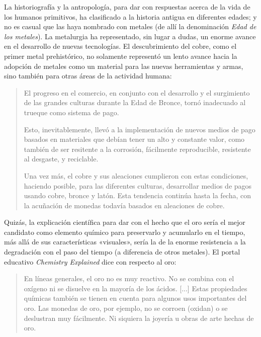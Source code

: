 \documentclass[12pt,a4paper,twoside]{book}
\begin{document}
La historiografía y la antropología, para dar con respuestas acerca de la vida de los humanos primitivos, ha clasificado a la historia antigua en diferentes edades; y no es casual que las haya nombrado con metales (de allí la denominación \textit{Edad de los metales}). La metalurgia ha representado, sin lugar a dudas, un enorme avance en el desarrollo de nuevas tecnologías. El descubrimiento del cobre, como el primer metal prehistórico, no solamente representó un lento avance hacia la adopción de metales como un material para las nuevas herramientas y armas, sino también para otras áreas de la actividad humana:

\begin{quotation}
El progreso en el comercio, en conjunto con el desarrollo y el surgimiento de las grandes culturas durante la Edad de Bronce, tornó inadecuado al trueque como sistema de pago.

Esto, inevitablemente, llevó a la implementación de nuevos medios de pago basados en materiales que debían tener un alto y constante valor, como también de ser resitente a la corrosión, fácilmente reproducible, resistente al desgaste, y reciclable.

Una vez más, el cobre y sus aleaciones cumplieron con estas condiciones, haciendo posible, para las diferentes culturas, desarrollar medios de pagos usando cobre, bronce y latón. Esta tendencia continúa hasta la fecha, con la acuñación de monedas todavía basados en aleaciones de cobre. \cite[pág. 37]{codelco:cobre}
\end{quotation}

Quizás, la explicación científica para dar con el hecho que el oro sería el mejor candidato como elemento químico para preservarlo y acumularlo en el tiempo, más allá de sus características «visuales», sería la de la enorme resistencia a la degradación con el paso del tiempo (a diferencia de otros metales). El portal educativo \textit{Chemistry Explained} dice con respecto al oro:

\begin{quotation}
En líneas generales, el oro no es muy reactivo. No se combina con el oxígeno ni se disuelve en la mayoría de los ácidos. [...] Estas propiedades químicas también se tienen en cuenta para algunos usos importantes del oro. Las monedas de oro, por ejemplo, no se corroen (oxidan) o se deslustran muy fácilmente. Ni siquiera la joyería u obras de arte hechas de oro. \cite{quimica:oro}
\end{quotation}
\end{document}
